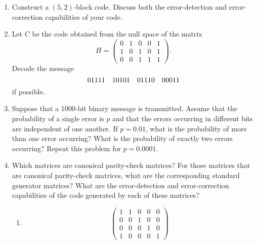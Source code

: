{\begin{enumerate}
\begin{multicols}{2}
\begin{enumerate}
\item
\[
\begin{pmatrix}
1 & 0 & 0 & 1 & 1 \\
0 & 1 & 0 & 1 & 1
\end{pmatrix}
\]

\item
\[
\begin{pmatrix}
0 & 0 & 0 & 1 & 1 & 1 & 1 \\
0 & 1 & 1 & 0 & 0 & 1 & 1 \\
1 & 0 & 1 & 0 & 1 & 0 & 1 \\
0 & 1 & 1 & 0 & 0 & 1 & 1
\end{pmatrix}
\]


\end{enumerate}
\end{multicols}

 
\item %
Construct a $(5,2)$-block code. Discuss both the error-detection and
error-correction capabilities of your code.
 
 
\item
Let $C$ be the code obtained from the null space of the matrix
\[
H =
\begin{pmatrix}
0 & 1 & 0 & 0 & 1 \\
1 & 0 & 1 & 0 & 1 \\
0 & 0 & 1 & 1 & 1
\end{pmatrix}.
\]
Decode the message
\[
01111 \quad 10101 \quad 01110 \quad 00011  \\
\]
if possible.
 
 
\item
Suppose that a 1000-bit binary message is transmitted. Assume that the
probability of a single error is $p$ and that the errors occurring in
different bits are independent of one another. If $p = 0.01$, what is
the probability of more than one error occurring? What is the
probability of exactly two errors occurring?  Repeat this problem for
$p = 0.0001$.
 
 
 \item
Which matrices are canonical parity-check matrices? For those matrices
that are canonical parity-check matrices, what are the corresponding
standard generator matrices? What are the error-detection and
error-correction capabilities of the code generated by each of these
matrices? 
\begin{multicols}{2}
\begin{enumerate}

\item
\[
\begin{pmatrix}
1 & 1 & 0 & 0 & 0 \\
0 & 0 & 1 & 0 & 0 \\
0 & 0 & 0 & 1 & 0 \\
1 & 0 & 0 & 0 & 1
\end{pmatrix}
\]


\end{enumerate}
\end{multicols}
\end{enumerate}}
